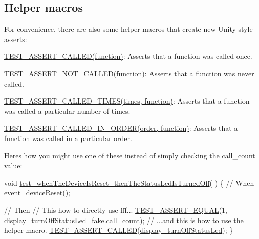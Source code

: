 \subsection*{Helper macros}

For convenience, there are also some helper macros that create new Unity-\/style asserts\+:


\begin{DoxyItemize}
\item {\ttfamily \hyperlink{fff__unity__helper_8h_a700b2bf57333b08698a494792c335bd1}{T\+E\+S\+T\+\_\+\+A\+S\+S\+E\+R\+T\+\_\+\+C\+A\+L\+L\+E\+D(function)}}\+: Asserts that a function was called once.
\item {\ttfamily \hyperlink{fff__unity__helper_8h_affc90aa528332c5c767fd7bd7542d525}{T\+E\+S\+T\+\_\+\+A\+S\+S\+E\+R\+T\+\_\+\+N\+O\+T\+\_\+\+C\+A\+L\+L\+E\+D(function)}}\+: Asserts that a function was never called.
\item {\ttfamily \hyperlink{fff__unity__helper_8h_a77e70db5c9f2a7482308e7dae59f9182}{T\+E\+S\+T\+\_\+\+A\+S\+S\+E\+R\+T\+\_\+\+C\+A\+L\+L\+E\+D\+\_\+\+T\+I\+M\+E\+S(times, function)}}\+: Asserts that a function was called a particular number of times.
\item {\ttfamily \hyperlink{fff__unity__helper_8h_af21f27d62b55519b5f72bb32724df80d}{T\+E\+S\+T\+\_\+\+A\+S\+S\+E\+R\+T\+\_\+\+C\+A\+L\+L\+E\+D\+\_\+\+I\+N\+\_\+\+O\+R\+D\+E\+R(order, function)}}\+: Asserts that a function was called in a particular order.
\end{DoxyItemize}

Here\textquotesingle{}s how you might use one of these instead of simply checking the call\+\_\+count value\+:


\begin{DoxyCode}
\textcolor{keywordtype}{void}
\hyperlink{test__event__processor_8c_aff1f691f0911be5857ddbe01e551c0a2}{test\_whenTheDeviceIsReset\_thenTheStatusLedIsTurnedOff}(
      )
\{
    \textcolor{comment}{// When}
    \hyperlink{event__processor_8c_ae1d8acf4a49fc2dd494f7838a3d290c9}{event\_deviceReset}();

    \textcolor{comment}{// Then}
    \textcolor{comment}{// This how to directly use fff...}
    \hyperlink{unity_8h_af9e5695d6c7cf634206ea6d062cb54c9}{TEST\_ASSERT\_EQUAL}(1, display\_turnOffStatusLed\_fake.call\_count);
    \textcolor{comment}{// ...and this is how to use the helper macro.}
    \hyperlink{fff__unity__helper_8h_a700b2bf57333b08698a494792c335bd1}{TEST\_ASSERT\_CALLED}(\hyperlink{display_8c_ace29b0b5f6128f04d1800a81a37ad248}{display\_turnOffStatusLed});
\}
\end{DoxyCode}


